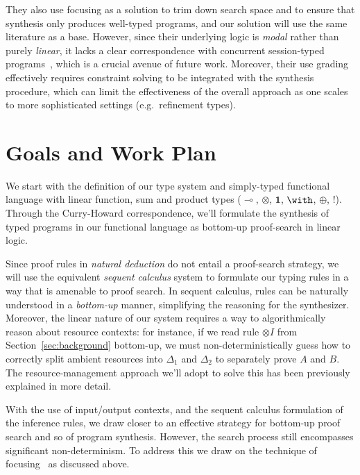 \documentclass{llncs}
\newcommand{\lolli}{\multimap}
\newcommand{\tensor}{\otimes}
\newcommand{\one}{\mathbf{1}}
\newcommand{\bang}{{!}}
\begin{document}
They also use focusing as a solution to trim down search space and to
ensure that synthesis only produces well-typed programs, and our
solution will use the same literature as a base.  However, since their
underlying logic is \emph{modal} rather than purely \emph{linear}, it
lacks a clear correspondence with concurrent session-typed
programs~\cite{DBLP:journals/mscs/CairesPT16,DBLP:conf/concur/CairesP10},
which is a crucial avenue of future work. Moreover, their use grading
effectively requires constraint solving to be integrated with the
synthesis procedure, which can limit the effectiveness of the overall
approach as one scales to more sophisticated settings (e.g.~refinement
types).


\section{Goals and Work Plan}

We start with the definition of our type system and simply-typed
functional language with linear function, sum and product types
($\lolli$, $\tensor$, $\one$, $\with$, $\oplus$, $\bang$).  Through
the Curry-Howard correspondence, we'll formulate the synthesis of
typed programs in our functional language as bottom-up proof-search in
linear logic.

Since proof rules in \emph{natural deduction} do not entail a
proof-search strategy, we will use the equivalent \emph{sequent
calculus} system to formulate our typing rules in a way that is
amenable to proof search.
%
In sequent calculus, rules can be naturally understood in a
\emph{bottom-up} manner, simplifying the reasoning for the
synthesizer. Moreover, the linear nature of our system requires a way
to algorithmically reason about resource contexts: for instance, if we
read rule $\tensor I$ from Section~\ref{sec:background} bottom-up, we
must non-deterministically guess how to correctly split ambient
resources into $\Delta_1$ and $\Delta_2$ to separately prove $A$ and
$B$. The resource-management approach we'll adopt to solve this has been 
previously explained in more detail.

With the use of input/output contexts, and the sequent calculus
formulation of the inference rules, we draw closer to an effective
strategy for bottom-up proof search and so of program synthesis.
%
%
However, the search process still encompasses significant
non-determinism. To address this we draw on the technique of
focusing~\cite{10.1093/logcom/2.3.297,DBLP:conf/cade/ChaudhuriP05} as
discussed above.
\end{document}
